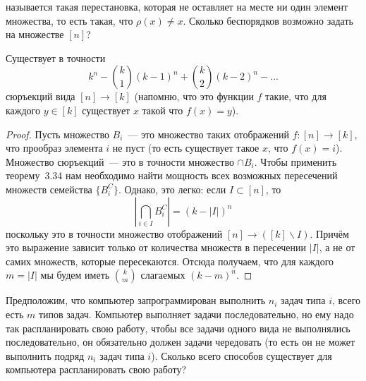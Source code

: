 \begin{exercise}
 называется такая перестановка, которая не оставляет на месте ни один элемент множества, то есть такая, что $\rho(x)\not=x$. Сколько беспорядков возможно задать на множестве $[n]$?
\end{exercise}

\begin{thm}
Существует в точности
$$k^n - {k \choose 1}(k-1)^n + {k\choose 2}(k-2)^n -\ldots$$
сюръекций вида $[n]\to[k]$ (напомню, что это функции $f$ такие, что для каждого $y\in[k]$ существует $x$ такой что $f(x) = y$).
\end{thm}
\begin{proof}
Пусть множество $B_i$~--- это множество таких отображений $f:[n]\to[k]$, что прообраз элемента $i$ не пуст (то есть существует такое $x$, что $f(x) = i$). Множество сюръекций~--- это в точности множество $\cap B_i$. Чтобы применить теорему~3.34 нам необходимо найти мощность всех возможных пересечений множеств семейства $\{B_i^C\}$. Однако, это легко: если $I\subset [n]$, то
$$\left|\bigcap_{i\in I} B_i^C\right| = (k-|I|)^n$$
поскольку это в точности множество отображений $[n]\to([k]\backslash I)$. Причём это выражение зависит только от количества множеств в пересечении $|I|$, а не от самих множеств, которые пересекаются. Отсюда получаем, что для каждого $m = |I|$ мы будем иметь $k\choose m$ слагаемых $(k-m)^n$.
\end{proof}

\begin{exercise}
Предположим, что компьютер запрограммирован выполнить $n_i$ задач типа $i$, всего есть $m$ типов задач. Компьютер выполняет задачи последовательно, но ему надо так распланировать свою работу, чтобы все задачи одного вида не выполнялись последовательно, он обязательно должен задачи чередовать (то есть он не может выполнить подряд $n_i$ задач типа $i$). Сколько всего способов существует для компьютера распланировать свою работу?
\end{exercise}

